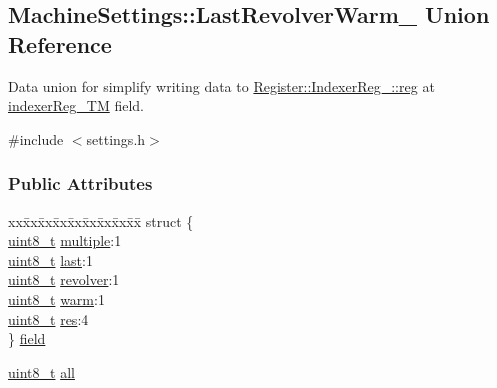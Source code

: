 \hypertarget{unionMachineSettings_1_1LastRevolverWarm__}{}\subsection{Machine\+Settings\+:\+:Last\+Revolver\+Warm\+\_\+ Union Reference}
\label{unionMachineSettings_1_1LastRevolverWarm__}

Data union for simplify writing data to \hyperlink{structRegister_1_1IndexerReg___1_1reg}{Register\+::\+Indexer\+Reg\+\_\+\+::reg} at \hyperlink{structRegister_1_1IndexerReg___1_1reg_a9b0063135d16e0ea6f47284c361bfb03}{indexer\+Reg\+\_\+\+TM} field.

{\ttfamily \#include $<$settings.\+h$>$}

\subsubsection*{Public Attributes}
\begin{DoxyCompactItemize}
\item 
\begin{tabbing}
xx\=xx\=xx\=xx\=xx\=xx\=xx\=xx\=xx\=\kill
struct \{\\
\>\mbox{\hyperlink{settings_8h_a48091a1e52849b0871df2f7081be2e38}{uint8\_t}} \mbox{\hyperlink{unionMachineSettings_1_1LastRevolverWarm___af00ee9727b68c6ca80f0881b1041dadb}{multiple}}:1\\
\>\mbox{\hyperlink{settings_8h_a48091a1e52849b0871df2f7081be2e38}{uint8\_t}} \mbox{\hyperlink{unionMachineSettings_1_1LastRevolverWarm___acf30bf07840c73f3abc7cf94f5de0460}{last}}:1\\
\>\mbox{\hyperlink{settings_8h_a48091a1e52849b0871df2f7081be2e38}{uint8\_t}} \mbox{\hyperlink{unionMachineSettings_1_1LastRevolverWarm___aeb91668abf5f88c7e94c6a42e8ea1d64}{revolver}}:1\\
\>\mbox{\hyperlink{settings_8h_a48091a1e52849b0871df2f7081be2e38}{uint8\_t}} \mbox{\hyperlink{unionMachineSettings_1_1LastRevolverWarm___a901129054579ae9f4d5d7d78c3bbb642}{warm}}:1\\
\>\mbox{\hyperlink{settings_8h_a48091a1e52849b0871df2f7081be2e38}{uint8\_t}} \mbox{\hyperlink{unionMachineSettings_1_1LastRevolverWarm___a4c650f2a502f1289b07ef0003fd5125a}{res}}:4\\
\} \mbox{\hyperlink{unionMachineSettings_1_1LastRevolverWarm___af87eee8850eab8526b469738642c96f9}{field}}\\

\end{tabbing}\item 
\mbox{\hyperlink{settings_8h_a48091a1e52849b0871df2f7081be2e38}{uint8\+\_\+t}} \mbox{\hyperlink{unionMachineSettings_1_1LastRevolverWarm___ad0d2e1937a99b03bb6deb9508d25590e}{all}}
\end{DoxyCompactItemize}


